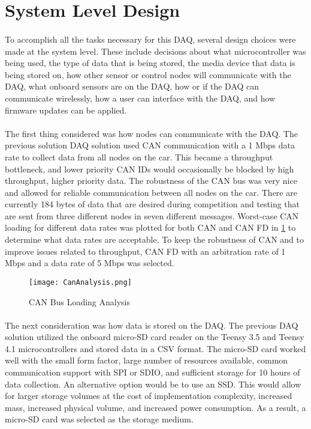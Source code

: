 \section{System Level Design}

\paragraph{}
To accomplish all the tasks necessary for this DAQ, several design choices were made at the system level.
These include decisions about what microcontroller was being used, the type of data that is being stored, the media device that data is being stored on, how other sensor or control nodes will communicate with the DAQ, what onboard sensors are on the DAQ, how or if the DAQ can communicate wirelessly, how a user can interface with the DAQ, and how firmware updates can be applied.

\paragraph{}
The first thing considered was how nodes can communicate with the DAQ.
The previous solution DAQ solution used CAN communication with a 1 Mbps data rate to collect data from all nodes on the car.
This became a throughput bottleneck, and lower priority CAN IDs would occasionally be blocked by high throughput, higher priority data.
The robustness of the CAN bus was very nice and allowed for reliable communication between all nodes on the car.
There are currently 184 bytes of data that are desired during competition and testing that are sent from three different nodes in seven different messages.
Worst-case CAN loading for different data rates was plotted for both CAN and CAN FD in \cref{fig:CANAnalysis} to determine what data rates are acceptable.
To keep the robustness of CAN and to improve issues related to throughput, CAN FD with an arbitration rate of 1 Mbps and a data rate of 5 Mbps was selected.

\begin{figure}[H]
	\centering
	\texttt{[image: CanAnalysis.png]}
	\caption{CAN Bus Loading Analysis}
	\label{fig:CANAnalysis}
\end{figure}

\paragraph{}
The next consideration was how data is stored on the DAQ.
The previous DAQ solution utilized the onboard micro-SD card reader on the Teensy 3.5 and Teensy 4.1 microcontrollers and stored data in a CSV format.
The micro-SD card worked well with the small form factor, large number of resources available, common communication support with SPI or SDIO, and sufficient storage for 10 hours of data collection.
An alternative option would be to use an SSD.
This would allow for larger storage volumes at the cost of implementation complexity, increased mass, increased physical volume, and increased power consumption.
As a result, a micro-SD card was selected as the storage medium.


